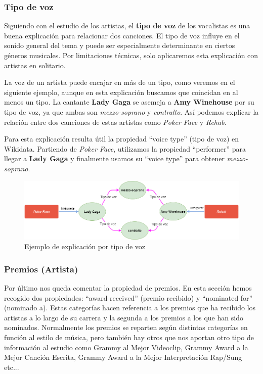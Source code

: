 \subsubsection*{Tipo de voz}

Siguiendo con el estudio de los artistas, el \textbf{tipo de voz} de los vocalistas es una buena explicación para relacionar dos canciones. El tipo de voz influye en el sonido general del tema y puede ser especialmente determinante en ciertos géneros musicales. Por limitaciones técnicas, solo aplicaremos esta explicación con artistas en solitario.

La voz de un artista puede encajar en más de un tipo, como veremos en el siguiente ejemplo, aunque en esta explicación buscamos que coincidan en al menos un tipo. La cantante \textbf{Lady Gaga} se asemeja a \textbf{Amy Winehouse} por su tipo de voz, ya que ambas son \textit{mezzo-soprano} y \textit{contralto}. Así podemos explicar la relación entre dos canciones de estas artistas como \textit{Poker Face} y \textit{Rehab}.

Para esta explicación resulta útil la propiedad ``voice type'' (tipo de voz) en Wikidata. Partiendo de \textit{Poker Face}, utilizamos la propiedad ``performer'' para llegar a \textbf{Lady Gaga} y finalmente usamos su ``voice type'' para obtener \textit{mezzo-soprano}.

\begin{figure}[h!]
	\centering
	\includegraphics[width = 1\textwidth]{Imagenes/Bitmap/Voz ejemplo.png}
	\caption{Ejemplo de explicación por tipo de voz}
	\label{fig:sampleImage}
\end{figure}

\subsubsection*{Premios (Artista)}
Por último nos queda comentar la propiedad de premios. En esta sección hemos recogido dos propiedades: ``award received'' (premio recibido) y ``nominated for'' (nominado a). Estas categorías hacen referencia a los premios que ha recibido los artistas a lo largo de su carrera y la segunda a los premios a los que han sido nominados. Normalmente los premios se reparten según distintas categorías en función al estilo de música, pero también hay otros que nos aportan otro tipo de información al estudio como Grammy al Mejor Videoclip, Grammy Award a la Mejor Canción Escrita, Grammy Award a la Mejor Interpretación Rap/Sung etc...\\\\\\

